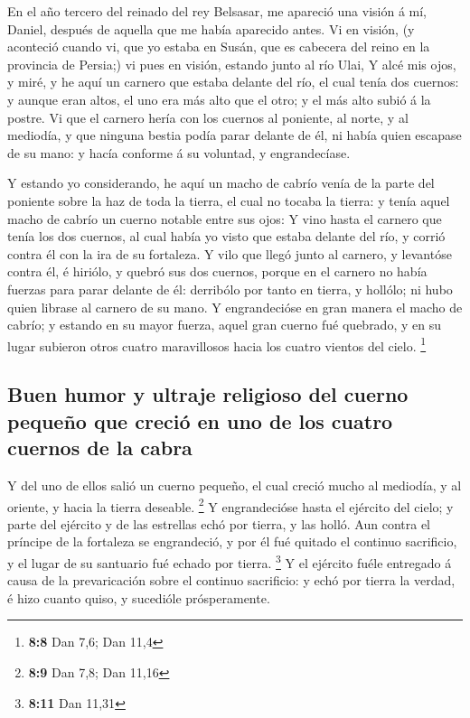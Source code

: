 En el año tercero del reinado del rey Belsasar, me apareció
una visión á mí, Daniel, después de aquella que me había aparecido
antes.  Vi en visión, (y aconteció cuando vi, que yo estaba
en Susán, que es cabecera del reino en la provincia de Persia;) vi pues
en visión, estando junto al río Ulai,  Y alcé mis ojos, y
miré, y he aquí un carnero que estaba delante del río, el cual tenía dos
cuernos: y aunque eran altos, el uno era más alto que el otro; y el más
alto subió á la postre.  Vi que el carnero hería con los
cuernos al poniente, al norte, y al mediodía, y que ninguna bestia podía
parar delante de él, ni había quien escapase de su mano: y hacía
conforme á su voluntad, y engrandecíase.

 Y estando yo considerando, he aquí un macho de cabrío venía
de la parte del poniente sobre la haz de toda la tierra, el cual no
tocaba la tierra: y tenía aquel macho de cabrío un cuerno notable entre
sus ojos:  Y vino hasta el carnero que tenía los dos
cuernos, al cual había yo visto que estaba delante del río, y corrió
contra él con la ira de su fortaleza.  Y vilo que llegó
junto al carnero, y levantóse contra él, é hiriólo, y quebró sus dos
cuernos, porque en el carnero no había fuerzas para parar delante de él:
derribólo por tanto en tierra, y hollólo; ni hubo quien librase al
carnero de su mano.  Y engrandecióse en gran manera el macho
de cabrío; y estando en su mayor fuerza, aquel gran cuerno fué quebrado,
y en su lugar subieron otros cuatro maravillosos hacia los cuatro
vientos del cielo. \footnote{\textbf{8:8} Dan 7,6; Dan 11,4}

\hypertarget{buen-humor-y-ultraje-religioso-del-cuerno-pequeuxf1o-que-creciuxf3-en-uno-de-los-cuatro-cuernos-de-la-cabra}{%
\subsection{Buen humor y ultraje religioso del cuerno pequeño que creció
en uno de los cuatro cuernos de la
cabra}\label{buen-humor-y-ultraje-religioso-del-cuerno-pequeuxf1o-que-creciuxf3-en-uno-de-los-cuatro-cuernos-de-la-cabra}}

 Y del uno de ellos salió un cuerno pequeño, el cual creció
mucho al mediodía, y al oriente, y hacia la tierra deseable. \footnote{\textbf{8:9}
  Dan 7,8; Dan 11,16}  Y engrandecióse hasta el ejército
del cielo; y parte del ejército y de las estrellas echó por tierra, y
las holló.  Aun contra el príncipe de la fortaleza se
engrandeció, y por él fué quitado el continuo sacrificio, y el lugar de
su santuario fué echado por tierra. \footnote{\textbf{8:11} Dan 11,31}
 Y el ejército fuéle entregado á causa de la prevaricación
sobre el continuo sacrificio: y echó por tierra la verdad, é hizo cuanto
quiso, y sucedióle prósperamente.

